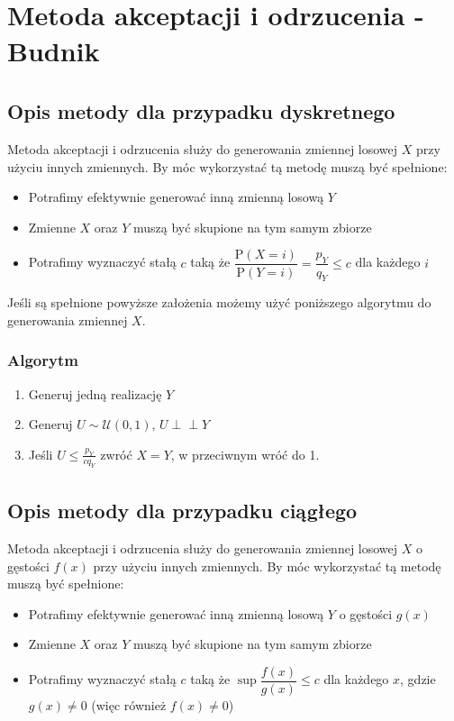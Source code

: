 \documentclass[12pt]{mwrep}
\newcommand{\indep}{\perp \!\!\! \perp}
\begin{document}

	
	\section{Metoda akceptacji i odrzucenia\textsuperscript{\cite{AO - dyskretny}} - Budnik}
	\subsection{Opis metody dla przypadku dyskretnego\textsuperscript{\cite{AO - dyskretny}}}
	Metoda akceptacji i odrzucenia służy do generowania zmiennej losowej $X$ przy użyciu innych zmiennych. By móc wykorzystać tą metodę muszą być spełnione:
	\begin{itemize}[leftmargin=10mm]
		\item Potrafimy efektywnie generować inną zmienną losową $Y$
		\item Zmienne $X$ oraz $Y$ muszą być skupione na tym samym zbiorze
		\item Potrafimy wyznaczyć stałą $c$ taką że $\dfrac{\mathrm{P}(X=i)}{\mathrm{P}(Y=i)}=\dfrac{p_Y}{q_Y}\leqslant c$ dla każdego $i$
	\end{itemize}
	Jeśli są spełnione powyższe założenia możemy użyć poniższego algorytmu do generowania zmiennej $X$.
	\subsubsection{Algorytm}
	\begin{enumerate}[leftmargin=10mm]
		\item Generuj jedną realizację $Y$
		\item Generuj $U\sim \mathcal{U}(0,1)$, $U\indep Y$
		\item Jeśli $U\leqslant\frac{p_Y}{cq_Y}$ zwróć $X=Y$, w przeciwnym wróć do 1.
	\end{enumerate}
	
	
	\subsection{Opis metody dla przypadku ciągłego\textsuperscript{\cite{AO - ciagly}}}
	Metoda akceptacji i odrzucenia służy do generowania zmiennej losowej $X$ o gęstości $f(x)$ przy użyciu innych zmiennych. By móc wykorzystać tą metodę muszą być spełnione:
	\begin{itemize}[leftmargin=10mm]
		\item Potrafimy efektywnie generować inną zmienną losową $Y$ o gęstości $g(x)$
		\item Zmienne $X$ oraz $Y$ muszą być skupione na tym samym zbiorze
		\item Potrafimy wyznaczyć stałą $c$ taką że $\sup\dfrac{f(x)}{g(x)}\leqslant c$ dla każdego $x$, gdzie $g(x)\neq0$ (więc również $f(x)\neq0$)
	\end{itemize}
\end{document}
